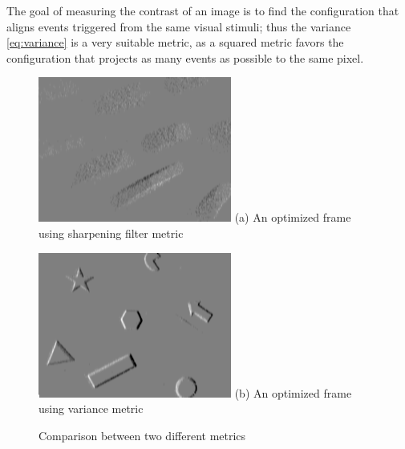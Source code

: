 The goal of measuring the contrast of an image is to find the
configuration that aligns events triggered from the same visual
stimuli; thus the variance \cref{eq:variance} is a very suitable
metric, as a squared metric favors the configuration that projects as
many events as possible to the same pixel.

\begin{figure}
  \begin{minipage}[t]{0.48\textwidth}
    \centering \includegraphics[width =
    \textwidth]{images/high_pass_contrast.png}
    (a) An optimized frame using sharpening filter metric
  \end{minipage}
  \hfill
  \begin{minipage}[t]{0.48\textwidth}
    \centering \includegraphics[width =
    \textwidth]{images/variance_contrast.png}
    (b) An optimized frame using variance metric
  \end{minipage}
  \caption{Comparison between two different metrics}
  \label{fig:contrast}
\end{figure}




